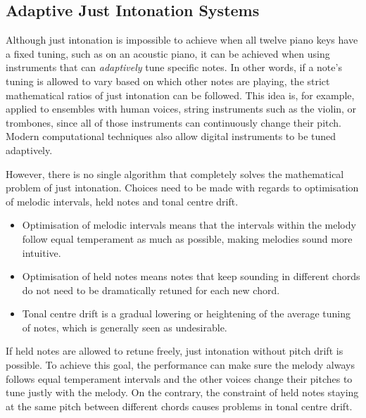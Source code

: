 \documentclass[a4paper]{article}
\begin{document}
\subsection{Adaptive Just Intonation Systems}
\label{intro_adaptive_ji}
Although just intonation is impossible to achieve when all twelve piano keys have a fixed tuning, such as on an acoustic piano, it can be achieved when using instruments that can \textit{adaptively} tune specific notes. In other words, if a note's tuning is allowed to vary based on which other notes are playing, the strict mathematical ratios of just intonation can be followed. This idea is, for example, applied to ensembles with human voices, string instruments such as the violin, or trombones, since all of those instruments can continuously change their pitch. \cite{van_de_craats_fis_1989} Modern computational techniques also allow digital instruments to be tuned adaptively. \cite{sethares_adaptive_2005}

However, there is no single algorithm that completely solves the mathematical problem of just intonation. Choices need to be made with regards to optimisation of melodic intervals, held notes and tonal centre drift.
\begin{itemize}
	\item Optimisation of melodic intervals means that the intervals within the melody follow equal temperament as much as possible, making melodies sound more intuitive. \cite{dougherty_choral_2004}
	\item Optimisation of held notes means notes that keep sounding in different chords do not need to be dramatically retuned for each new chord.
	\item Tonal centre drift is a gradual lowering or heightening of the average tuning of notes, which is generally seen as undesirable. \cite{barbershop_harmony_society_contest_2022}
\end{itemize}
If held notes are allowed to retune freely, just intonation without pitch drift is possible. To achieve this goal, the performance can make sure the melody always follows equal temperament intervals and the other voices change their pitches to tune justly with the melody. \cite{dougherty_choral_2004} On the contrary, the constraint of held notes staying at the same pitch between different chords causes problems in tonal centre drift.
\end{document}
